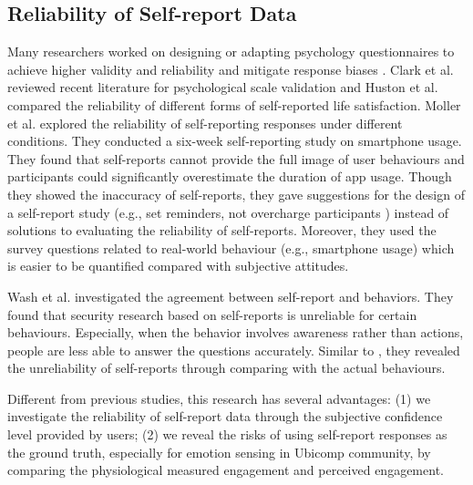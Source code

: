 \documentclass[sigconf]{acmart}
\begin{document}
\subsection{Reliability of Self-report Data}
Many researchers worked on designing or adapting psychology questionnaires to achieve higher validity and reliability and mitigate response biases \cite{barclay2002not,jackson2018stepovers,sonderen2013ineffectiveness, clark2019constructing,hudson2020comparing}. Clark et al. \cite{clark2019constructing} reviewed recent literature for psychological scale validation and Huston et al. \cite{hudson2020comparing} compared the reliability of different forms of self-reported life satisfaction.
Moller et al. \cite{moller2013investigating} explored the reliability of self-reporting responses under different conditions. They conducted a six-week self-reporting study on smartphone usage. They found that self-reports cannot provide the full image of user behaviours and participants could significantly overestimate the duration of app usage. Though they showed the inaccuracy of self-reports, they gave suggestions for the design of a self-report study (e.g., set reminders, not overcharge participants ) instead of solutions to evaluating the reliability of self-reports. Moreover, they used the survey questions related to real-world behaviour (e.g., smartphone usage) which is easier to be quantified compared with subjective attitudes. 

Wash et al. \cite{wash2017can} investigated the agreement between self-report and behaviors. They found that security research based on self-reports is unreliable for certain behaviours. Especially, when the behavior involves awareness rather than actions, people are less able to answer the questions accurately. Similar to \cite{moller2013investigating}, they revealed the unreliability of self-reports through comparing with the actual behaviours.  

Different from previous studies, this research has several advantages: (1) we investigate the reliability of self-report data through the subjective confidence level provided by users; (2) we reveal the risks of using self-report responses as the ground truth, especially for emotion sensing in Ubicomp community, by comparing the physiological measured engagement and perceived engagement.   

\end{document}
